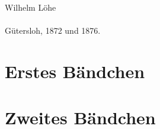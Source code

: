 \documentclass{oll-book}
\begin{document}
\frontmatter
\begin{titelseite}
\\[1.5em]
Wilhelm Löhe\\[1.5em]
\\[1.5em]
Gütersloh, 1872 und 1876.
\end{titelseite}
\tableofcontents
\mainmatter
\part{Erstes Bändchen}

\part{Zweites Bändchen}

\end{document}
